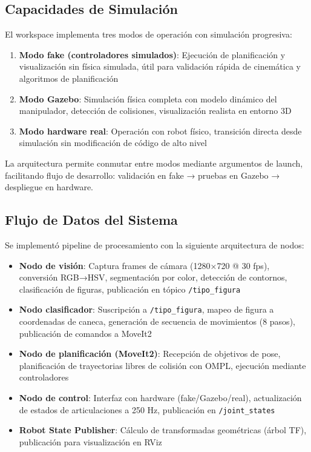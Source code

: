 \subsection{Capacidades de Simulación}

El workspace implementa tres modos de operación con simulación progresiva:

\begin{enumerate}
    \item \textbf{Modo fake (controladores simulados)}: Ejecución de planificación y visualización sin física simulada, útil para validación rápida de cinemática y algoritmos de planificación
    
    \item \textbf{Modo Gazebo}: Simulación física completa con modelo dinámico del manipulador, detección de colisiones, visualización realista en entorno 3D
    
    \item \textbf{Modo hardware real}: Operación con robot físico, transición directa desde simulación sin modificación de código de alto nivel
\end{enumerate}

La arquitectura permite conmutar entre modos mediante argumentos de launch, facilitando flujo de desarrollo: validación en fake → pruebas en Gazebo → despliegue en hardware.

\subsection{Flujo de Datos del Sistema}

Se implementó pipeline de procesamiento con la siguiente arquitectura de nodos:

\begin{itemize}
    \item \textbf{Nodo de visión}: Captura frames de cámara (1280×720 @ 30 fps), conversión RGB→HSV, segmentación por color, detección de contornos, clasificación de figuras, publicación en tópico \texttt{/tipo\_figura}
    
    \item \textbf{Nodo clasificador}: Suscripción a \texttt{/tipo\_figura}, mapeo de figura a coordenadas de caneca, generación de secuencia de movimientos (8 pasos), publicación de comandos a MoveIt2
    
    \item \textbf{Nodo de planificación (MoveIt2)}: Recepción de objetivos de pose, planificación de trayectorias libres de colisión con OMPL, ejecución mediante controladores
    
    \item \textbf{Nodo de control}: Interfaz con hardware (fake/Gazebo/real), actualización de estados de articulaciones a 250 Hz, publicación en \texttt{/joint\_states}
    
    \item \textbf{Robot State Publisher}: Cálculo de transformadas geométricas (árbol TF), publicación para visualización en RViz
\end{itemize}


